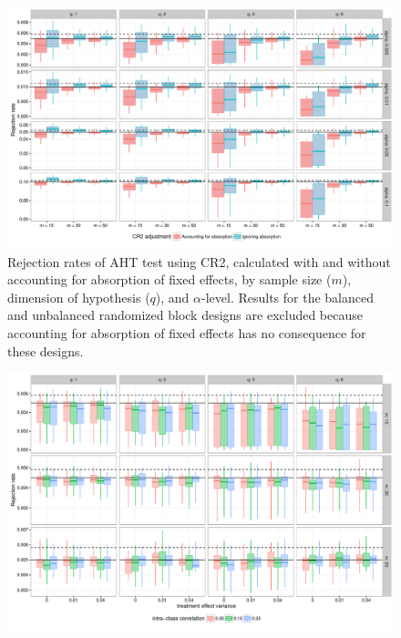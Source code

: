 \documentclass{article}\usepackage[]{graphicx}\usepackage[]{color}
\newenvironment{knitrout}{}{} %
\begin{document}
\begin{landscape}

\begin{knitrout}
\color{fgcolor}\begin{figure}[H]

{\centering \includegraphics[width=\linewidth]{CR_fig/absorption-1} 

}

\caption[Rejection rates of AHT test using CR2, calculated with and without accounting for absorption of fixed effects, by sample size (]{Rejection rates of AHT test using CR2, calculated with and without accounting for absorption of fixed effects, by sample size ($m$), dimension of hypothesis ($q$), and $\alpha $-level. Results for the balanced and unbalanced randomized block designs are excluded because accounting for absorption of fixed effects has no consequence for these designs.}\label{fig:absorption}
\end{figure}


\end{knitrout}

\begin{knitrout}
\color{fgcolor}\begin{figure}[H]

{\centering \includegraphics[width=\linewidth]{CR_fig/misspecification_005-1} 

}
\end{figure}
\end{knitrout}
\end{landscape}
\end{document}
